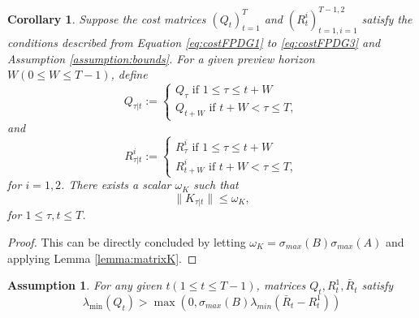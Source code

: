 \documentclass{article}
\newtheorem{assumption}{Assumption}
\newtheorem{corollary}{Corollary}
\begin{document}
\begin{corollary}\label{corrolary:boundedK}
    Suppose the cost matrices $(Q_{t})_{t=1}^{T}$ and $(R_{t}^{i})_{t=1,i=1}^{T-1,2}$ satisfy the conditions described from Equation \eqref{eq:costFPDG1} to \eqref{eq:costFPDG3} and Assumption \ref{assumption:bounds}.
    For a given preview horizon $W(0\leq W \leq T-1)$, define
    \begin{equation}
        Q_{\tau|t}:= 
        \begin{cases}
            Q_{\tau} \text{ if $1\leq \tau \leq t+W$}\\
            Q_{t+W} \text{ if $t+W < \tau \leq T$},
        \end{cases}
    \end{equation}
    and
    \begin{equation}
        R_{\tau|t}^{i}:= 
        \begin{cases}
            R_{\tau}^{i} \text{ if $1\leq \tau \leq t+W$}\\
            R_{t+W}^{i} \text{ if $t+W < \tau \leq T$},
        \end{cases}
    \end{equation}
    for $i = {1,2}$.
    There exists a scalar $\omega_{K}$ such that
    \begin{equation*}
        \|K_{\tau|t}\| \leq \omega_{K},
    \end{equation*}
    for $1\leq \tau,t\leq T$.
\end{corollary}

\begin{proof}
    This can be directly concluded by letting $\omega_{K} = \sigma_{max}(B)\sigma_{max}(A)$ and applying Lemma \ref{lemma:matrixK}.
\end{proof}

\begin{assumption}\label{assumption:lowerQ}
    For any given $t(1\leq t \leq T-1)$, matrices $Q_{t}, R_{t}^{1}, \bar{R}_{t}$ satisfy
    \begin{equation}
        \lambda_{\min}(Q_{t}) > \max(0,\sigma_{max}(B)\lambda_{min}(\bar{R}_{t}-R_{t}^{1}))
    \end{equation}
\end{assumption}
\end{document}
